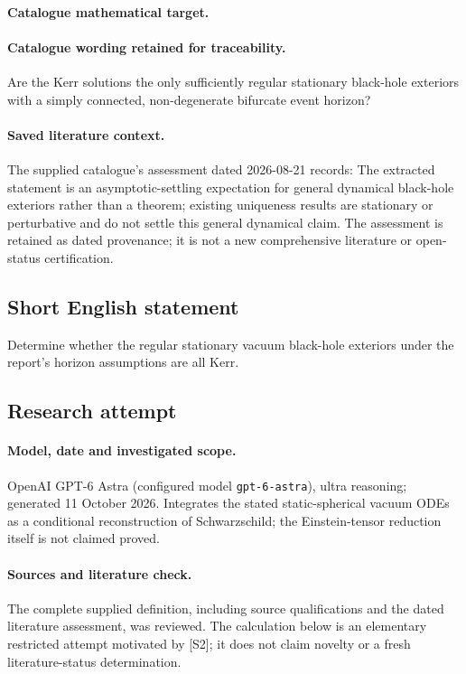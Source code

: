 \documentclass[11pt]{article}
\begin{document}
\paragraph{Catalogue mathematical target.}
\paragraph{Catalogue wording retained for traceability.}
Are the Kerr solutions the only sufficiently regular stationary black-hole exteriors with a simply connected, non-degenerate bifurcate event horizon?

\paragraph{Saved literature context.} The supplied catalogue's assessment dated 2026-08-21 records: The extracted statement is an asymptotic-settling expectation for general dynamical black-hole exteriors rather than a theorem; existing uniqueness results are stationary or perturbative and do not settle this general dynamical claim. The assessment is retained as dated provenance; it is not a new comprehensive literature or open-status certification.
\subsection{Short English statement}
Determine whether the regular stationary vacuum black-hole exteriors under the report's horizon assumptions are all Kerr.
\subsection{Research attempt}
\paragraph{Model, date and investigated scope.}
OpenAI GPT-6 Astra (configured model \texttt{gpt-6-astra}), ultra reasoning; generated 11 October 2026. Integrates the stated static-spherical vacuum ODEs as a conditional reconstruction of Schwarzschild; the Einstein-tensor reduction itself is not claimed proved.

\paragraph{Sources and literature check.}
The complete supplied definition, including source qualifications and the dated literature assessment, was reviewed. The calculation below is an elementary restricted attempt motivated by [S2]; it does not claim novelty or a fresh literature-status determination.
\end{document}

